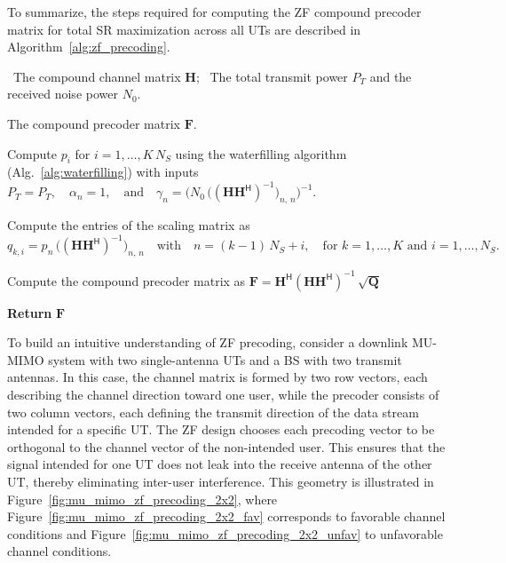 To summarize, the steps required for computing the \ac{ZF} compound precoder matrix for total \ac{SR} maximization across all \acp{UT} are described in Algorithm~\ref{alg:zf_precoding}.
\begin{algorithm}[!htbp]
\caption{\ac{ZF} Precoding}
\label{alg:zf_precoding}
\begin{algorithmic}[1]
    
    \Require 
    \Statex \hspace{-\algorithmicindent} \textbullet \, The compound channel matrix $\mathbf{H}$;
    \Statex \hspace{-\algorithmicindent} \textbullet \, The total transmit power $P_T$ and the received noise power $N_0$.
    
    \Ensure  The compound precoder matrix $\mathbf{F}$.

    \medskip
    \State Compute $p_i$ for $i = 1, \dots, K\,N_S$ using the waterfilling algorithm (Alg.~\ref{alg:waterfilling}) with inputs
    \Statex $P_T = P_T, \quad \alpha_n = 1, \quad \text{and} \quad  \gamma_n = \big(N_0 \, \big((\mathbf{H} \mathbf{H}^{\mathsf{H}})^{-1}\big)_{n,\,n}\big)^{-1}.$
    
    \vspace{0.4\baselineskip}
    \State Compute the entries of the scaling matrix as
    \Statex $q_{k, i} = p_n \, \big((\mathbf{H} \mathbf{H}^{\mathsf{H}})^{-1}\big)_{n,\,n} \quad \text{with} \quad n = (k-1)\,N_S + i, \quad \text{for  } k = 1, \dots, K \text{  and  } i = 1, \dots, N_S.$

    \vspace{0.4\baselineskip}
    \State Compute the compound precoder matrix as
    \Statex $\mathbf{F} = \mathbf{H}^{\mathsf{H}} (\mathbf{H} \mathbf{H}^{\mathsf{H}})^{-1} \, \sqrt{\mathbf{Q}}$

    \medskip
    \Statex \hspace{-\algorithmicindent}\textbf{Return} \; $\mathbf{F}$

\end{algorithmic}
\end{algorithm}


To build an intuitive understanding of \ac{ZF} precoding, consider a downlink \ac{MU}-\ac{MIMO} system with two single-antenna \acp{UT} and a \ac{BS} with two transmit antennas.
In this case, the channel matrix is formed by two row vectors, each describing the channel direction toward one user, while the precoder consists of two column vectors, each defining the transmit direction of the data stream intended for a specific \ac{UT}.
The \ac{ZF} design chooses each precoding vector to be orthogonal to the channel vector of the non-intended user.
This ensures that the signal intended for one \ac{UT} does not leak into the receive antenna of the other \ac{UT}, thereby eliminating inter-user interference.
This geometry is illustrated in Figure~\ref{fig:mu_mimo_zf_precoding_2x2}, where Figure~\ref{fig:mu_mimo_zf_precoding_2x2_fav} corresponds to favorable channel conditions and Figure~\ref{fig:mu_mimo_zf_precoding_2x2_unfav} to unfavorable channel conditions.


